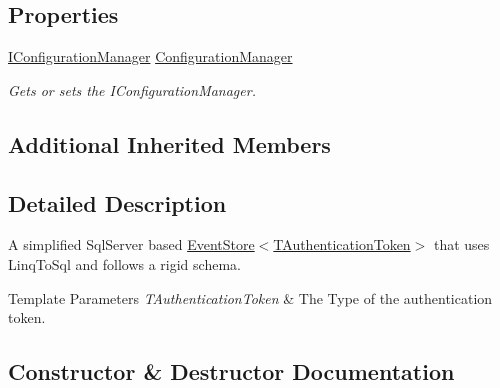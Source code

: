 \subsection*{Properties}
\begin{DoxyCompactItemize}
\item 
\hyperlink{interfaceCqrs_1_1Configuration_1_1IConfigurationManager}{I\+Configuration\+Manager} \hyperlink{classCqrs_1_1Events_1_1SqlEventStore_ac74de2a6905b38d167bcb23055e19b3d_ac74de2a6905b38d167bcb23055e19b3d}{Configuration\+Manager}
\begin{DoxyCompactList}\small\item\em Gets or sets the I\+Configuration\+Manager. \end{DoxyCompactList}\end{DoxyCompactItemize}
\subsection*{Additional Inherited Members}


\subsection{Detailed Description}
A simplified Sql\+Server based \hyperlink{classCqrs_1_1Events_1_1EventStore_a6346cb2aea4c5b4e740dc6cfb15abab8_a6346cb2aea4c5b4e740dc6cfb15abab8}{Event\+Store$<$\+T\+Authentication\+Token$>$} that uses Linq\+To\+Sql and follows a rigid schema. 


\begin{DoxyTemplParams}{Template Parameters}
{\em T\+Authentication\+Token} & The Type of the authentication token.\\
\hline
\end{DoxyTemplParams}


\subsection{Constructor \& Destructor Documentation}
\mbox{\label{classCqrs_1_1Events_1_1SqlEventStore_a15df78a1b12d2e3035b9715e9bfc8535_a15df78a1b12d2e3035b9715e9bfc8535}} 
